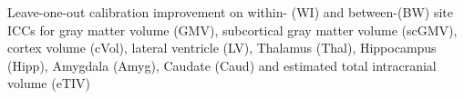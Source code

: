 \label{fig:calib} Leave-one-out calibration improvement on within- (WI) and between-(BW) site ICCs for gray matter volume (GMV), subcortical gray matter volume (scGMV), cortex volume (cVol), lateral ventricle (LV), Thalamus (Thal), Hippocampus (Hipp), Amygdala (Amyg), Caudate (Caud) and estimated total intracranial volume (eTIV)